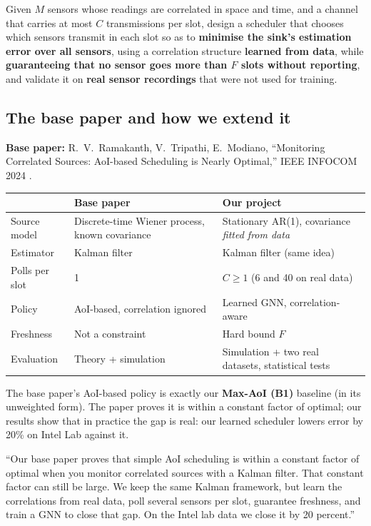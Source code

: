 \begin{keybox}
Given $M$ sensors whose readings are correlated in space and time, and a channel that carries at most $C$
transmissions per slot, design a scheduler that chooses which sensors transmit in each slot so as to
\textbf{minimise the sink's estimation error over all sensors}, using a correlation structure \textbf{learned from
data}, while \textbf{guaranteeing that no sensor goes more than $F$ slots without reporting}, and validate it on
\textbf{real sensor recordings} that were not used for training.
\end{keybox}

\subsection{The base paper and how we extend it}

\textbf{Base paper:} R.~V.~Ramakanth, V.~Tripathi, E.~Modiano, ``Monitoring Correlated Sources: AoI-based Scheduling
is Nearly Optimal,'' IEEE INFOCOM 2024 \cite{2}.

\begin{center}
\begin{tabularx}{\textwidth}{@{}lXX@{}}
\toprule
& \textbf{Base paper} & \textbf{Our project} \\
\midrule
Source model & Discrete-time Wiener process, known covariance & Stationary AR(1), covariance \emph{fitted from data} \\
Estimator & Kalman filter & Kalman filter (same idea) \\
Polls per slot & 1 & $C\ge1$ (6 and 40 on real data) \\
Policy & AoI-based, correlation ignored & Learned GNN, correlation-aware \\
Freshness & Not a constraint & Hard bound $F$ \\
Evaluation & Theory + simulation & Simulation + two real datasets, statistical tests \\
\bottomrule
\end{tabularx}
\end{center}

The base paper's AoI-based policy is exactly our \textbf{Max-AoI (B1)} baseline (in its unweighted form). The paper
proves it is within a constant factor of optimal; our results show that in practice the gap is real: our learned
scheduler lowers error by 20\% on Intel Lab against it.

\begin{saybox}
``Our base paper proves that simple AoI scheduling is within a constant factor of optimal when you monitor
correlated sources with a Kalman filter. That constant factor can still be large. We keep the same Kalman framework,
but learn the correlations from real data, poll several sensors per slot, guarantee freshness, and train a GNN to
close that gap. On the Intel lab data we close it by 20 percent.''
\end{saybox}

